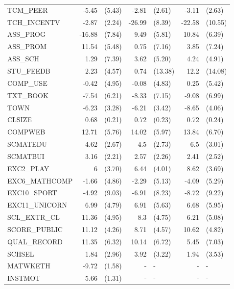 \documentclass[10pt]{article}
\begin{document}
\begin{table}[H]
\begin{threeparttable}
\begin{tabular}{lrlrlrl}
				TCM\_PEER & -5.45 & (5.43) & -2.81 & (2.61) & -3.11 & (2.63) \\[0.2em]
				TCH\_INCENTV & -2.87 & (2.24) & -26.99 & (8.39) & -22.58 & (10.55) \\[0.2em]
				ASS\_PROG & -16.88 & (7.84) & 9.49  & (5.81) & 10.84 & (6.39) \\[0.2em]
				ASS\_PROM & 11.54 & (5.48) & 0.75  & (7.16) & 3.85  & (7.24) \\[0.2em]
				ASS\_SCH & 1.29  & (7.39) & 3.62  & (5.20) & 4.24  & (4.91) \\[0.2em]
				STU\_FEEDB & 2.23  & (4.57) & 0.74  & (13.38) & 12.2  & (14.08) \\[0.2em]
				COMP\_USE & -0.42 & (4.95) & -0.08 & (4.83) & 0.25  & (5.42) \\[0.2em]
				TXT\_BOOK & -7.54 & (6.21) & -8.33 & (7.15) & -9.08 & (6.99) \\[0.2em]
				TOWN  & -6.23 & (3.28) & -6.21 & (3.42) & -8.65 & (4.06) \\[0.2em]
				CLSIZE & 0.68  & (0.21) & 0.72  & (0.23) & 0.72  & (0.24) \\[0.2em]
				COMPWEB & 12.71 & (5.76) & 14.02 & (5.97) & 13.84 & (6.70) \\[0.2em]
				SCMATEDU & 4.62  & (2.67) & 4.5   & (2.73) & 6.5   & (3.01) \\[0.2em]
				SCMATBUI & 3.16  & (2.21) & 2.57  & (2.26) & 2.41  & (2.52) \\[0.2em]
				EXC2\_PLAY & 6     & (3.70) & 6.44  & (4.01) & 8.62  & (3.69) \\[0.2em]
				EXC6\_MATHCOMP & -1.66 & (4.86) & -2.29 & (5.13) & -4.09 & (5.29) \\[0.2em]
				EXC10\_SPORT & -4.92 & (9.03) & -6.91 & (8.23) & -8.72 & (9.22) \\[0.2em]
				EXC11\_UNICORN & 6.99  & (4.79) & 6.91  & (5.63) & 6.68  & (5.95) \\[0.2em]
				SCL\_EXTR\_CL & 11.36 & (4.95) & 8.3   & (4.75) & 6.21  & (5.08) \\[0.2em]
				SCORE\_PUBLIC & 11.12 & (4.26) & 8.71  & (4.57) & 10.62 & (4.82) \\[0.2em]
				QUAL\_RECORD & 11.35 & (6.32) & 10.14 & (6.72) & 5.45  & (7.03) \\[0.2em]
				SCHSEL & 1.84  & (2.96) & 3.92  & (3.22) & 1.94  & (3.53) \\[0.2em]
				MATWKETH & -9.72 & (1.58) & -     & -     & -     & - \\[0.2em]
				INSTMOT & 5.66  & (1.31) & -     & -     & -     & - \\[0.2em]

\end{tabular}
\end{threeparttable}
\end{table}
\end{document}
